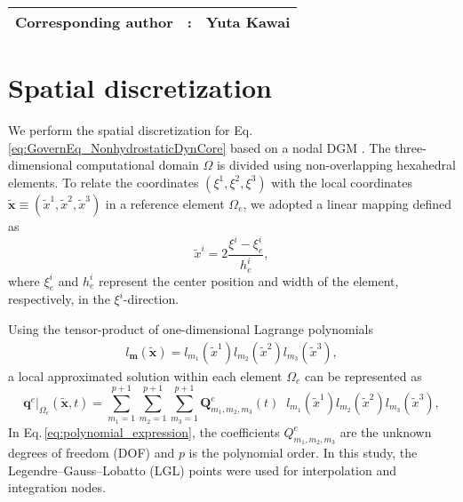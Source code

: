 {\bf \Large
\begin{tabular}{ccc}
\hline
  Corresponding author & : & Yuta Kawai\\
\hline
\end{tabular}
}

\section{Spatial discretization}
We perform the spatial discretization for Eq.\,\eqref{eq:GovernEq_NonhydrostaticDynCore}
based on a nodal DGM \citep[e.g.,][]{hesthaven2007nodal}. 
The three-dimensional computational domain $\Omega$ is divided 
using non-overlapping hexahedral elements. 
To relate the coordinates $(\xi^1,\xi^2, \xi^3)$ with the local coordinates 
$\tilde{\bm{x}} \equiv (\tilde{x}^1,\tilde{x}^2,\tilde{x}^3)$ 
in a reference element $\Omega_e$, 
we adopted a linear mapping defined as 
\begin{equation}
 \tilde{x}^i = 2\dfrac{\xi^i-\xi^i_e}{h^i_{e}}, 
\label{eq:linear_mapping}
\end{equation}
where 
$\xi^i_{e}$ and $h^i_e$ represent the center position and width of the element, respectively, in the $\xi^i$-direction. 


Using the tensor-product of one-dimensional Lagrange polynomials 
\begin{align}
 l_{\bm{m}} (\tilde{\bm{x}}) = l_{m_1}(\tilde{x}^1) l_{m_2}(\tilde{x}^2) l_{m_3} (\tilde{x}^3),   
\end{align}
a local approximated solution within each element $\Omega_e$ can be represented as
\begin{equation}
  \bm{q}^e|_{\Omega_e} (\tilde{\bm{x}},t) 
  = \sum_{m_1=1}^{p+1} \sum_{m_2=1}^{p+1} \sum_{m_3=1}^{p+1} 
      \bm{Q}^e_{m_1,m_2,m_3} (t) \;\; l_{m_1}(\tilde{x}^1) l_{m_2}(\tilde{x}^2) l_{m_3} (\tilde{x}^3), 
\label{eq:polynomial_expression}
\end{equation}
In Eq.\,\eqref{eq:polynomial_expression}, 
the coefficients $Q^e_{m_1,m_2,m_3}$ are the unknown degrees of freedom (DOF) 
and $p$ is the polynomial order.
In this study, the  Legendre--Gauss--Lobatto (LGL) points were used for interpolation and integration nodes. 


